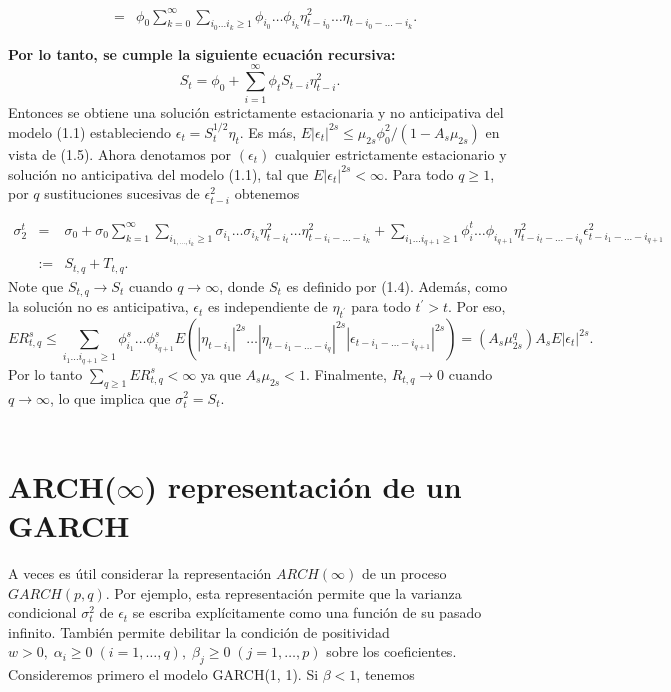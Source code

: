 \begin{teo}
$$\begin{array}{rcl}
								 &=&\phi_0 \sum\limits_{k=0}^\infty \sum\limits_{i_0 \ldots i_k \geq 1} \phi_{i_0}\ldots \phi_{i_k} \eta^2_{t-i_0}\ldots \eta_{t-i_0 - \ldots - i_k}.\\\\
	\end{array}$$
	\textbf{Por lo tanto, se cumple la siguiente ecuación recursiva:}
	$$S_t = \phi_0 + \sum_{i=1}^\infty \phi_t S_{t-i} \eta_{t-i}^2.$$
	Entonces se obtiene una solución estrictamente estacionaria y no anticipativa del modelo (1.1) estableciendo $\epsilon_t = S_t^{1/2} \eta_t.$ Es más, $E|\epsilon_t|^{2s}\leq \mu_{2s} \phi_0^2 / (1-A_s \mu_{2s})$ en vista de (1.5). Ahora denotamos por $(\epsilon_t)$ cualquier estrictamente estacionario y solución no anticipativa del modelo (1.1), tal que $E|\epsilon_t|^{2s}< \infty$. Para todo $q\geq 1$, por $q$ sustituciones sucesivas de $\epsilon^2_{t-i}$ obtenemos

	$$\begin{array}{rcl}
	    \sigma_2^t & = & \sigma_0 + \sigma_0 \sum\limits_{k=1}^\infty \sum\limits_{i_{1,\ldots,i_k}\geq 1} \sigma_{i_1} \ldots \sigma_{i_k} \eta_{t-i_t}^2 \ldots \eta_{t-i_i - \ldots - i_k}^2 + \sum\limits_{i_1 \ldots i_{q+1}\geq 1} \phi_i^t \ldots \phi_{i_{q+1}} \eta_{t-i_t - \ldots - i_q}^2 \epsilon_{t-i_1 - \ldots - i_{q+1}}^2\\\\
		       &:=&S_{t,q} + T_{t,q}.
	\end{array}$$
	Note que $S_{t,q} \rightarrow S_t$ cuando $q \rightarrow \infty$, donde $S_t$ es definido por (1.4). Además, como la solución no es anticipativa, $\epsilon_t$ es independiente de $\eta_{t^{'}}$ para todo $t^{'}>t$. Por eso,
	$$ER_{t,q}^s \leq \sum_{i_1 \ldots i_{q+1}\geq 1} \phi_{i_1}^s \ldots \phi_{i_{q+1}}^s E\left(|\eta_{t-i_1}|^{2s} \ldots |\eta_{t-i_1 - \ldots - i_q}|^{2s} |\epsilon_{t-i_1-\ldots - i_{q+1}}|^{2s}\right) = (A_s \mu_{2s}^q) A_s E|\epsilon_t|^{2s}.$$
	Por lo tanto $\sum_{q\geq 1}ER_{t,q}^s < \infty$ ya que $A_s \mu_{2s}<1$. Finalmente, $R_{t,q} \rightarrow 0$ cuando $q\rightarrow \infty$, lo que implica que $\sigma_t^2 = S_t$.\\\\

\end{teo}

\section{ARCH($\infty$) representación de un GARCH}
A veces es útil considerar la representación $ARCH(\infty)$ de un proceso $GARCH(p, q)$. Por ejemplo, esta representación permite que la varianza condicional $\sigma_t^2$  de $\epsilon_t$ se escriba explícitamente como una función de su pasado infinito. También permite debilitar la condición de positividad $w>0,\; \alpha_i\geq 0 \; (i=1,\ldots,q),\; \beta_j \geq 0\; (j=1,\ldots , p)$ sobre los coeficientes. Consideremos primero el modelo GARCH(1, 1). Si $\beta<1$, tenemos

